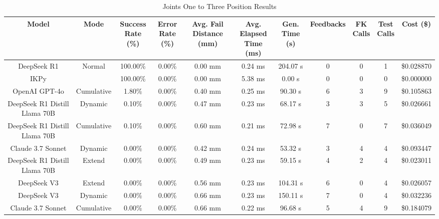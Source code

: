 \begin{table}[H]
\tiny
\renewcommand{\arraystretch}{1.2}
\caption{Joints One to Three Position Results}
\begin{center}
\begin{tabular}{|c|c|c|c|c|c|c|c|c|c|c|}
    \hline
    \textbf{Model} & 
    \textbf{Mode} & 
    \makecell{\textbf{Success}\\\textbf{Rate (\%)}} &
    \makecell{\textbf{Error}\\\textbf{Rate (\%)}} &
    \makecell{\textbf{Avg. Fail}\\\textbf{Distance (mm)}} &
    \makecell{\textbf{Avg. Elapsed}\\\textbf{Time (ms)}} &
    \makecell{\textbf{Gen.}\\\textbf{Time (s)}} &
    \textbf{Feedbacks} &
    \makecell{\textbf{FK}\\\textbf{Calls}} &
    \makecell{\textbf{Test}\\\textbf{Calls}} &
    \textbf{Cost (\$)} \\
    \hline
    DeepSeek R1 & Normal & 100.00\% & 0.00\% & 0.00 mm & 0.24 ms & 204.07 s & 0 & 0 & 1 & \$0.028870 \\
    \hline
    IKPy &  & 100.00\% & 0.00\% & 0.00 mm & 5.38 ms & 0.00 s & 0 & 0 & 0 & \$0.000000 \\
    \hline
    OpenAI GPT-4o & Cumulative & 1.80\% & 0.00\% & 0.40 mm & 0.25 ms & 90.30 s & 6 & 3 & 9 & \$0.105863 \\
    \hline
    DeepSeek R1 Distill Llama 70B & Dynamic & 0.10\% & 0.00\% & 0.47 mm & 0.23 ms & 68.17 s & 3 & 3 & 5 & \$0.026661 \\
    \hline
    DeepSeek R1 Distill Llama 70B & Cumulative & 0.10\% & 0.00\% & 0.60 mm & 0.21 ms & 72.98 s & 7 & 0 & 7 & \$0.036049 \\
    \hline
    Claude 3.7 Sonnet & Dynamic & 0.00\% & 0.00\% & 0.42 mm & 0.24 ms & 53.32 s & 3 & 4 & 4 & \$0.093447 \\
    \hline
    DeepSeek R1 Distill Llama 70B & Extend & 0.00\% & 0.00\% & 0.49 mm & 0.23 ms & 59.15 s & 4 & 2 & 4 & \$0.023011 \\
    \hline
    DeepSeek V3 & Extend & 0.00\% & 0.00\% & 0.56 mm & 0.23 ms & 104.31 s & 6 & 0 & 4 & \$0.026057 \\
    \hline
    DeepSeek V3 & Dynamic & 0.00\% & 0.00\% & 0.66 mm & 0.23 ms & 150.11 s & 7 & 0 & 4 & \$0.032236 \\
    \hline
    Claude 3.7 Sonnet & Cumulative & 0.00\% & 0.00\% & 0.66 mm & 0.22 ms & 96.68 s & 5 & 4 & 9 & \$0.184079 \\

\end{tabular}
\end{center}
\end{table}
